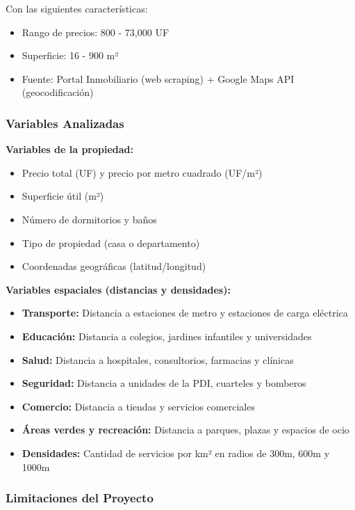 Con las siguientes características:
\begin{itemize}
    \item Rango de precios: 800 - 73,000 UF
    \item Superficie: 16 - 900 m²
    \item Fuente: Portal Inmobiliario (web scraping) + Google Maps API (geocodificación)
\end{itemize}

\subsubsection{Variables Analizadas}

\textbf{Variables de la propiedad:}
\begin{itemize}
    \item Precio total (UF) y precio por metro cuadrado (UF/m²)
    \item Superficie útil (m²)
    \item Número de dormitorios y baños
    \item Tipo de propiedad (casa o departamento)
    \item Coordenadas geográficas (latitud/longitud)
\end{itemize}

\textbf{Variables espaciales (distancias y densidades):}
\begin{itemize}
    \item \textbf{Transporte:} Distancia a estaciones de metro y estaciones de carga eléctrica
    \item \textbf{Educación:} Distancia a colegios, jardines infantiles y universidades
    \item \textbf{Salud:} Distancia a hospitales, consultorios, farmacias y clínicas
    \item \textbf{Seguridad:} Distancia a unidades de la PDI, cuarteles y bomberos
    \item \textbf{Comercio:} Distancia a tiendas y servicios comerciales
    \item \textbf{Áreas verdes y recreación:} Distancia a parques, plazas y espacios de ocio
    \item \textbf{Densidades:} Cantidad de servicios por km² en radios de 300m, 600m y 1000m
\end{itemize}

\subsubsection{Limitaciones del Proyecto}

